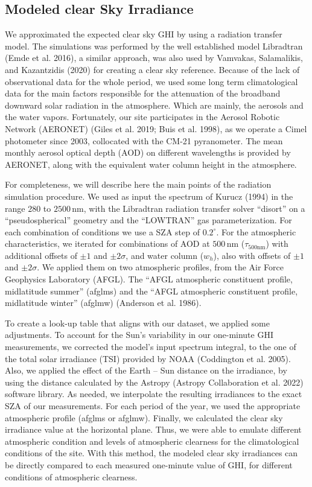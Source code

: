 \documentclass[
]{article}
\begin{document}
\hypertarget{modeled-clear-sky-irradiance}{%
\subsection{Modeled clear Sky Irradiance}\label{modeled-clear-sky-irradiance}}

We approximated the expected clear sky GHI by using a radiation transfer model. The
simulations was performed by the well established model Libradtran (Emde et al. 2016), a
similar approach, was also used by Vamvakas, Salamalikis, and Kazantzidis (2020) for creating a clear sky reference.
Because of the lack of observational data for the whole period, we used some long
term climatological data for the main factors responsible for the attenuation of the
broadband downward solar radiation in the atmosphere. Which are mainly, the aerosols
and the water vapors. Fortunately, our site participates in the Aerosol Robotic
Network (AERONET) (Giles et al. 2019; Buis et al. 1998), as we operate a Cimel photometer since
2003, collocated with the CM-21 pyranometer. The mean monthly aerosol optical depth
(AOD) on different wavelengths is provided by AERONET, along with the equivalent
water column height in the atmosphere.

For completeness, we will describe here the main points of the radiation simulation
procedure. We used as input the spectrum of Kurucz (1994) in the range \(280\) to
\(2500\,\text{nm}\), with the Libradtran radiation transfer solver ``disort'' on a
``pseudospherical'' geometry and the ``LOWTRAN'' gas parameterization. For each
combination of conditions we use a SZA step of \(0.2^\circ\).
For the atmospheric characteristics, we iterated for combinations of AOD at
\(500\,\text{nm}\) (\(\tau_{500\text{nm}}\)) with additional offsets of \(\pm1\) and
\(\pm2\sigma\), and water column (\(w_h\)), also with offsets of \(\pm1\) and \(\pm2\sigma\).
We applied them on two atmospheric profiles, from the Air Force Geophysics
Laboratory (AFGL). The ``AFGL atmospheric constituent profile, midlatitude summer''
(afglms) and the ``AFGL atmospheric constituent profile, midlatitude winter'' (afglmw)
(Anderson et al. 1986).

To create a look-up table that aligns with our dataset, we applied some adjustments.
To account for the Sun's variability in our one-minute GHI measurements, we corrected
the model's input spectrum integral, to the one of the total solar irradiance (TSI)
provided by NOAA (Coddington et al. 2005). Also, we applied the effect of the Earth -- Sun
distance on the irradiance, by using the distance calculated by the Astropy
(Astropy Collaboration et al. 2022) software library. As needed, we interpolate the resulting
irradiances to the exact SZA of our measurements. For each period of the year, we
used the appropriate atmospheric profile (afglms or afglmw). Finally, we calculated
the clear sky irradiance value at the horizontal plane. Thus, we were able to
emulate different atmospheric condition and levels of atmospheric clearness for the
climatological conditions of the site. With this method, the modeled clear sky
irradiances can be directly compared to each measured one-minute value of GHI, for
different conditions of atmospheric clearness.
\end{document}
